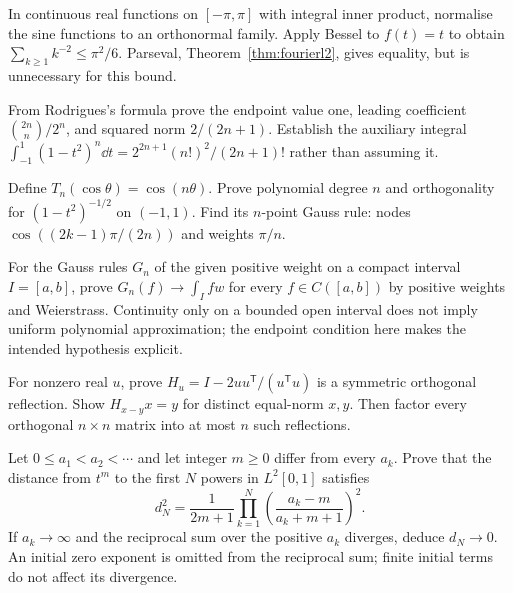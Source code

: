\begin{exercise}[$\star\star$]\label{linear:ex:basel}
In continuous real functions on $[-\pi,\pi]$ with integral inner product, normalise the sine functions to an orthonormal family. Apply Bessel to $f(t)=t$ to obtain $\sum_{k\ge1}k^{-2}\le\pi^2/6$. Parseval, Theorem~\ref{thm:fourierl2}, gives equality, but is unnecessary for this bound.
\end{exercise}
\begin{exercise}[$\star\star$]\label{linear:ex:legendrenorm}
From Rodrigues's formula prove the endpoint value one, leading coefficient $\binom{2n}n/2^n$, and squared norm $2/(2n+1)$. Establish the auxiliary integral $\int_{-1}^1(1-t^2)^n\dd t=2^{2n+1}(n!)^2/(2n+1)!$ rather than assuming it.
\end{exercise}
\begin{exercise}[$\star\star$]\label{linear:ex:chebyshev}
Define $T_n(\cos\theta)=\cos(n\theta)$. Prove polynomial degree $n$ and orthogonality for $(1-t^2)^{-1/2}$ on $(-1,1)$. Find its $n$-point Gauss rule: nodes $\cos((2k-1)\pi/(2n))$ and weights $\pi/n$.
\end{exercise}
\begin{exercise}[$\star\star$]\label{linear:ex:gaussconv}
For the Gauss rules $G_n$ of the given positive weight on a compact interval $I=[a,b]$, prove $G_n(f)\to\int_Ifw$ for every $f\in C([a,b])$ by positive weights and Weierstrass. Continuity only on a bounded open interval does not imply uniform polynomial approximation; the endpoint condition here makes the intended hypothesis explicit.
\end{exercise}
\begin{exercise}[$\star\star$]\label{linear:ex:householder}
For nonzero real $u$, prove $H_u=I-2uu^{\mathsf T}/(u^{\mathsf T}u)$ is a symmetric orthogonal reflection. Show $H_{x-y}x=y$ for distinct equal-norm $x,y$. Then factor every orthogonal $n\times n$ matrix into at most $n$ such reflections.
\end{exercise}
\begin{exercise}[$\star\star\star$]\label{linear:ex:muntz}
Let $0\le a_1<a_2<\cdots$ and let integer $m\ge0$ differ from every $a_k$. Prove that the distance from $t^m$ to the first $N$ powers in $L^2[0,1]$ satisfies
\[d_N^2=\frac1{2m+1}\prod_{k=1}^N\left(\frac{a_k-m}{a_k+m+1}\right)^2.\]
If $a_k\to\infty$ and the reciprocal sum over the positive $a_k$ diverges, deduce $d_N\to0$. An initial zero exponent is omitted from the reciprocal sum; finite initial terms do not affect its divergence.
\end{exercise}

